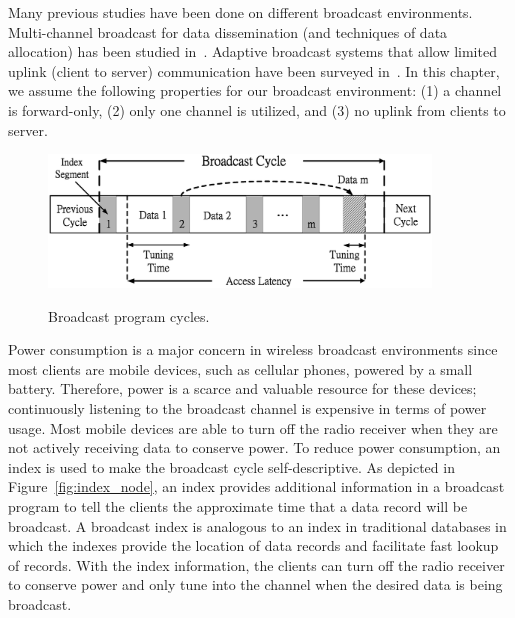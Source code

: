 Many previous studies have been done on different broadcast
environments. Multi-channel broadcast for data dissemination (and
techniques of data allocation) has been studied
in~\cite{conf/cikm/HsuLC01,conf/cikm/YeeN03,conf/mobicom/HameedV97}.
Adaptive broadcast systems that allow limited uplink (client to
server) communication have been surveyed
in~\cite{journals/pieee/Wong88}. In this chapter, we assume the
following properties for our broadcast environment: (1) a channel
is forward-only, (2) only one channel is utilized, and (3) no
uplink from clients to server.

\begin{figure}[!h]
\begin{center}
\includegraphics[width=4in]{Figures/BroadcastCycle.eps}
\vspace*{-15pt} \caption{Broadcast program cycles.}\vspace*{-10pt}
\label{fig:bcastcycle}
\end{center}
\end{figure}

Power consumption is a major concern in wireless broadcast
environments since most clients are mobile devices, such as
cellular phones, powered by a small battery. Therefore, power is a
scarce and valuable resource for these devices; continuously
listening to the broadcast channel is expensive in terms of power
usage. Most mobile devices are able to turn off the radio receiver
when they are not actively receiving data to conserve power. To
reduce power consumption, an index is used to make the broadcast
cycle self-descriptive. As depicted in
Figure~\ref{fig:index_node}, an index provides additional
information in a broadcast program to tell the clients the
approximate time that a data record will be broadcast. A broadcast
index is analogous to an index in traditional databases in which
the indexes provide the location of data records and facilitate
fast lookup of records. With the index information, the clients
can turn off the radio receiver to conserve power and only tune
into the channel when the desired data is being broadcast.

